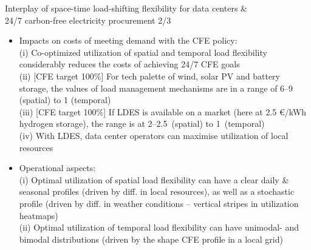 \begin{frame}{Interplay of space-time load-shifting flexibility for data centers \& \\ 
  24/7 carbon-free electricity procurement 2/3}

{\footnotesize
\begin{itemize}

  \item [24/7 CFE costs] Impacts on costs of meeting demand with the CFE policy:\\ 
        (i) Co-optimized utilization of spatial and temporal load flexibility \alert{considerably reduces the costs of achieving 24/7 CFE goals} \\
        (ii) [CFE target 100\%] For tech palette of wind, solar PV and battery storage, the values of load management mechanisms are in a range of 6--9 (spatial) to 1 (temporal) \\
        (iii) [CFE target 100\%] If LDES is available on a market (here at 2.5 €/kWh hydrogen storage), the range is at 2--2.5~(spatial) to 1~(temporal) \\
        (iv) With LDES, data center operators can maximise utilization of local resources

  \item Operational aspects:\\
        (i) Optimal utilization of spatial load flexibility can have 
        \alert {a clear daily \& seasonal profiles} (driven by diff. in local resources), 
        as well as a \alert{stochastic profile} (driven by diff. in weather conditions -- vertical stripes in utilization heatmaps) \\
        (ii) Optimal utilization of temporal load flexibility can have \alert{unimodal- and bimodal distributions} (driven by the shape CFE profile in a local grid)


\end{itemize}
}

\end{frame}



